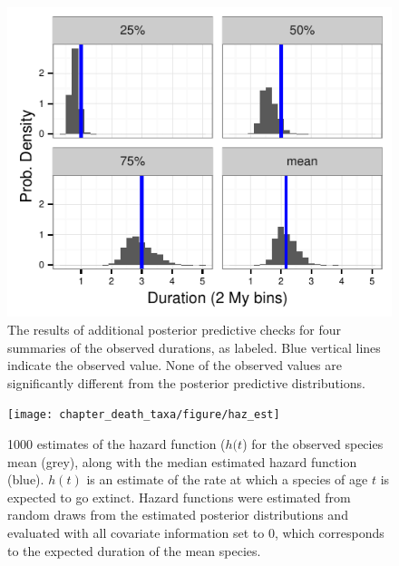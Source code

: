 \begin{figure}[ht]
  \centering
  \includegraphics[height = 0.5\textheight, width = \textwidth, keepaspectratio = true]{chapter_death_taxa/figure/quant_ppc}
  \caption[Additional posterior predictive checks]{The results of additional posterior predictive checks for four summaries of the observed durations, as labeled. Blue vertical lines indicate the observed value. None of the observed values are significantly different from the posterior predictive distributions.}
  \label{fig:ppc_quant}
\end{figure}

\begin{figure}[ht]
  \centering
  \texttt{[image: chapter\_death\_taxa/figure/haz\_est]}
  \caption[Estimate of hazard function for mammal survival]{1000 estimates of the hazard function (\(h(t\)) for the observed species mean (grey), along with the median estimated hazard function (blue). \(h(t)\) is an estimate of the rate at which a species of age \(t\) is expected to go extinct. Hazard functions were estimated from random draws from the estimated posterior distributions and evaluated with all covariate information set to 0, which corresponds to the expected duration of the mean species.}
  \label{fig:haz}
\end{figure}

